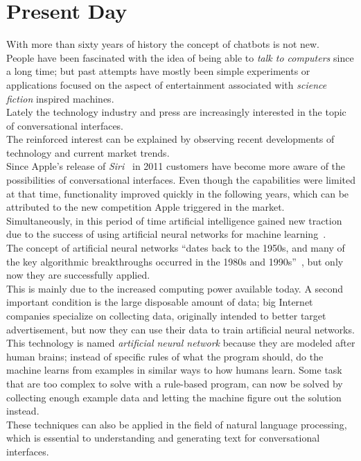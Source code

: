 \section{Present Day}
\label{presentday}


With more than sixty years of history the concept of chatbots is not new.
\\
People have been fascinated with the idea of being able to \emph{talk to computers} since a long time;
but past attempts have mostly been simple experiments or applications focused on the aspect of entertainment associated with \emph{science fiction} inspired machines.
\\

Lately the technology industry and press are increasingly interested in the topic of conversational interfaces.
\\
The reinforced interest can be explained by observing recent developments of technology and current market trends.
\\

Since Apple's release of \emph{Siri}~\cite{iphonelaunch} in 2011 customers have become more aware of the possibilities of conversational interfaces.
Even though the capabilities were limited at that time,
functionality improved quickly in the following years,
which can be attributed to the new competition Apple triggered in the market.
\\

Simultaneously, in this period of time artificial intelligence gained new traction due to the success of using artificial neural networks for machine learning~\cite{mltrend}.
\\
The concept of artificial neural networks ``dates back to the 1950s, and many of the key algorithmic breakthroughs occurred in the 1980s and 1990s''~\cite{airevolution},
but only now they are successfully applied.
\\
This is mainly due to the increased computing power available today.
A second important condition is the large disposable amount of data;
big Internet companies specialize on collecting data, originally intended to better target advertisement,
but now they can use their data to train artificial neural networks.
\\
This technology is named \emph{artificial neural network} because they are modeled after human brains;
instead of specific rules of what the program should, do the machine learns from examples in similar ways to how humans learn.
Some task that are too complex to solve with a rule-based program, can now be solved by collecting enough example data
and letting the machine figure out the solution instead.
\\
These techniques can also be applied in the field of natural language processing,
which is essential to understanding and generating text for conversational interfaces.
\\

